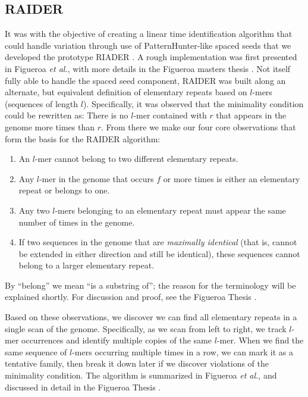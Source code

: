 \documentclass{bmcart}
\begin{document}
\subsection*{RAIDER}
\label{RAIDERSec}
It was with the objective of creating a linear time identification
algorithm that could handle variation through use of
PatternHunter-like spaced seeds that we developed the prototype RIADER
\cite{Li:2004wl}.  A rough implementation was first presented in
Figueroa {\it et al.}, with more details in the Figueroa masters
thesis \cite{Figueroa:2014uk,Figueroa:2013cz}.  Not itself fully able
to handle the spaced seed component, RAIDER was built along an
alternate, but equivalent definition of elementary repeats based on
$l$-mers (sequences of length $l$).  Specifically, it was observed
that the minimality condition could be rewritten as: 
There is no $l$-mer contained with $r$ that appears in the genome
more times than $r$.  From there we make our four core observations that form
the basis for the RAIDER algorithm:
\begin{enumerate}
\item An $l$-mer cannot belong to two different elementary repeats.
\item Any $l$-mer in the genome that occurs $f$ or more times is
  either an elementary repeat or belongs to one.
\item Any two $l$-mers belonging to an elementary repeat must appear
  the same number of times in the genome. 
\item If two sequences in the genome that are {\it maximally
  identical} (that is, cannot be extended in either direction and still
  be identical), these sequences cannot belong to a larger
  elementary repeat.
\end{enumerate}
By ``belong'' we mean ``is a substring of''; the reason for the
terminology will be explained shortly.  For discussion and proof, see
the Figueroa Thesis \cite{Figueroa:2013cz}. 

Based on these observations, we discover we can find all elementary
repeats in a single scan of the genome.  Specifically, as we scan from
left to right, we track $l$-mer occurrences and identify multiple
copies of the same $l$-mer.  When we find the same sequence of $l$-mers
occurring multiple times in a row, we can mark it as a tentative family,
then break it down later if we discover violations of the minimality
condition.  The algorithm is summarized in Figueroa {\it et al.}, and
discussed in detail in the Figueroa Thesis \cite{Figueroa:2014uk,Figueroa:2013cz}.
\end{document}
